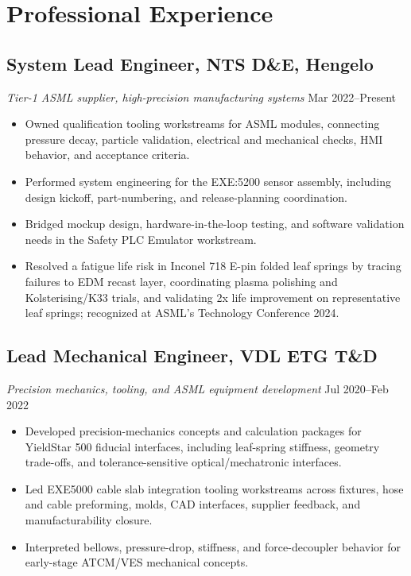 \documentclass[11pt,a4paper]{article}
\begin{document}
\section{Professional Experience}

\subsection{System Lead Engineer, NTS D\&E, Hengelo}
{\small\textit{Tier-1 ASML supplier, high-precision manufacturing systems}} \hfill {\small Mar 2022--Present}
\begin{itemize}
 \item Owned qualification tooling workstreams for ASML modules, connecting pressure decay, particle validation, electrical and mechanical checks, HMI behavior, and acceptance criteria.
 \item Performed system engineering for the EXE:5200 sensor assembly, including design kickoff, part-numbering, and release-planning coordination.
 \item Bridged mockup design, hardware-in-the-loop testing, and software validation needs in the Safety PLC Emulator workstream.
 \item Resolved a fatigue life risk in Inconel 718 E-pin folded leaf springs by tracing failures to EDM recast layer, coordinating plasma polishing and Kolsterising/K33 trials, and validating 2x life improvement on representative leaf springs; recognized at ASML's Technology Conference 2024.
\end{itemize}

\subsection{Lead Mechanical Engineer, VDL ETG T\&D}
{\small\textit{Precision mechanics, tooling, and ASML equipment development}} \hfill {\small Jul 2020--Feb 2022}
\begin{itemize}
 \item Developed precision-mechanics concepts and calculation packages for YieldStar 500 fiducial interfaces, including leaf-spring stiffness, geometry trade-offs, and tolerance-sensitive optical/mechatronic interfaces.
 \item Led EXE5000 cable slab integration tooling workstreams across fixtures, hose and cable preforming, molds, CAD interfaces, supplier feedback, and manufacturability closure.
 \item Interpreted bellows, pressure-drop, stiffness, and force-decoupler behavior for early-stage ATCM/VES mechanical concepts.
\end{itemize}
\end{document}
